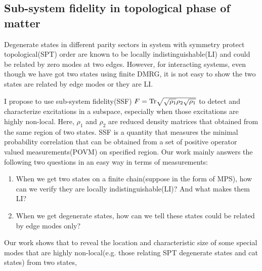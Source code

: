 \documentclass[a4paper]{article}
\newcommand{\<}{\langle}
\renewcommand{\>}{\rangle}
\begin{document}
\subsection{Sub-system fidelity in topological phase of matter}

Degenerate states in different parity sectors in system with symmetry protect topological(SPT) order are known to be locally indistinguishable(LI) and could be related by zero modes at two edges.
However, for interacting systems, even though we have got two states using finite DMRG,
it is not easy to show the two states are related by edge modes or they are LI.%

I propose to use sub-system fidelity(SSF) $F={\rm Tr}\sqrt{\sqrt{\rho_1}\rho_2\sqrt{\rho_1}}$ to detect and characterize excitations in a subspace, especially when those excitations are highly non-local.
Here, $\rho_1$ and $\rho_2$ are reduced density matrices that obtained from the same region of two states.
SSF is a quantity that measures the minimal probability correlation that can be obtained from a set of positive operator valued measurements(POVM) on specified region.
Our work mainly answers the following two questions in an easy way in terms of measurements:
\begin{enumerate}
    \item When we get two states on a finite chain(suppose in the form of MPS), how can we verify they are locally indistinguishable(LI)?
        And what makes them LI?
    \item When we get degenerate states, how can we tell these states could be related by edge modes only?
\end{enumerate}
Our work shows that to reveal the location and characteristic size of some special modes that are highly non-local(e.g. those relating SPT degenerate states and cat states) from two states,
\end{document}
